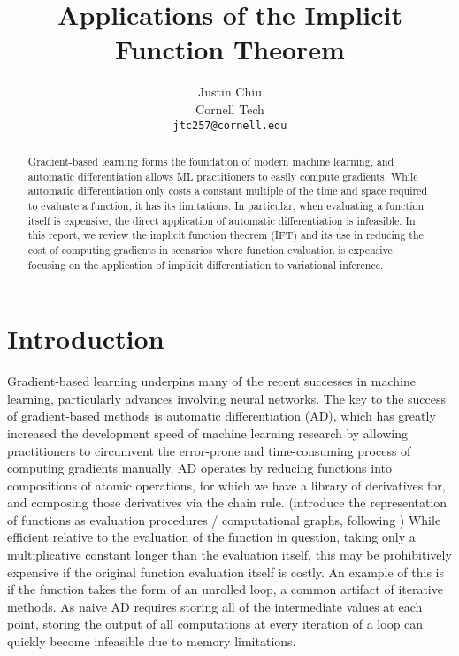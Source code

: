 \documentclass[11pt]{article}
\title{Applications of the Implicit Function Theorem}
\author{Justin Chiu \\
  Cornell Tech \\
  \texttt{jtc257@cornell.edu}}
\begin{document}
\maketitle
\begin{abstract}
Gradient-based learning forms the foundation of modern machine learning,
and automatic differentiation allows ML practitioners to easily compute gradients.
While automatic differentiation only costs a constant multiple of the time and space
required to evaluate a function, it has its limitations.
In particular, when evaluating a function itself is expensive,
the direct application of automatic differentiation is infeasible.
In this report, we review the implicit function theorem (IFT)
and its use in reducing the cost of computing gradients in scenarios where
function evaluation is expensive,
focusing on the application of implicit differentiation to variational inference.
\end{abstract}

\section{Introduction}
Gradient-based learning underpins many of the recent successes in machine learning,
particularly advances involving neural networks.
The key to the success of gradient-based methods is automatic differentiation (AD),
which has greatly increased the development speed of machine learning research by
allowing practitioners to circumvent the error-prone and time-consuming process
of computing gradients manually.
AD operates by reducing functions into compositions of atomic operations,
for which we have a library of derivatives for,
and composing those derivatives via the chain rule.
(introduce the representation of functions as evaluation procedures / computational graphs,
following \citet{griewank2008autodiff})
While efficient relative to the evaluation of the function in question,
taking only a multiplicative constant longer than the evaluation itself,
this may be prohibitively expensive if the original function evaluation itself is costly.
An example of this is if the function takes the form of an unrolled loop,
a common artifact of iterative methods.
As naive AD requires storing all of the intermediate values at each point,
storing the output of all computations at every iteration of a loop can quickly
become infeasible due to memory limitations.
\end{document}
